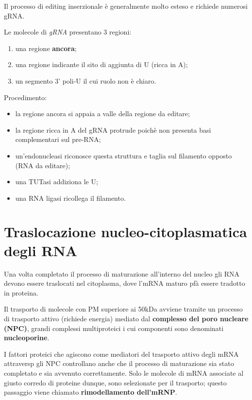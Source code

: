 \documentclass[11pt]{book}
\begin{document}
Il processo di editing inserzionale è generalmente molto esteso e
richiede numerosi gRNA.

Le molecole di \emph{gRNA} presentano 3 regioni:

\begin{enumerate}
\def\labelenumi{\arabic{enumi}.}
\itemsep1pt\parskip0pt
\item
  una regione \textbf{ancora};
\item
  una regione indicante il sito di aggiunta di U (ricca in A);
\item
  un segmento 3' poli-U il cui ruolo non è chiaro.
\end{enumerate}

Procedimento:

\begin{itemize}
\itemsep1pt\parskip0pt
\item
  la regione ancora si appaia a valle della regione da editare;
\item
  la regione ricca in A del gRNA protrude poichè non presenta basi
  complementari sul pre-RNA;
\item
  un'endonucleasi riconosce questa struttura e taglia sul filamento
  opposto (RNA da editare);
\item
  una TUTasi addiziona le U;
\item
  una RNA ligasi ricollega il filamento.
\end{itemize}

\section{Traslocazione nucleo-citoplasmatica degli
RNA}\label{traslocazione-nucleo-citoplasmatica-degli-rna}

Una volta completato il processo di maturazione all'interno del nucleo
gli RNA devono essere traslocati nel citoplasma, dove l'mRNA maturo pfà
essere tradotto in proteina.

Il trasporto di molecole con PM superiore ai 50kDa avviene tramite un
processo di trasporto attivo (richiede energia) mediato dal
\textbf{complesso del poro nucleare (NPC)}, grandi complessi
multiproteici i cui componenti sono denominati \textbf{nucleoporine}.

I fattori proteici che agiscono come mediatori del trasporto attivo
degli mRNA attraversp gli NPC controllano anche che il processo di
maturazione sia stato completato e sia avvenuto correttamente. Solo le
molecole di mRNA associate al giusto corredo di proteine dunque, sono
selezionate per il trasporto; questo passaggio viene chiamato
\textbf{rimodellamento dell'mRNP}.
\end{document}
